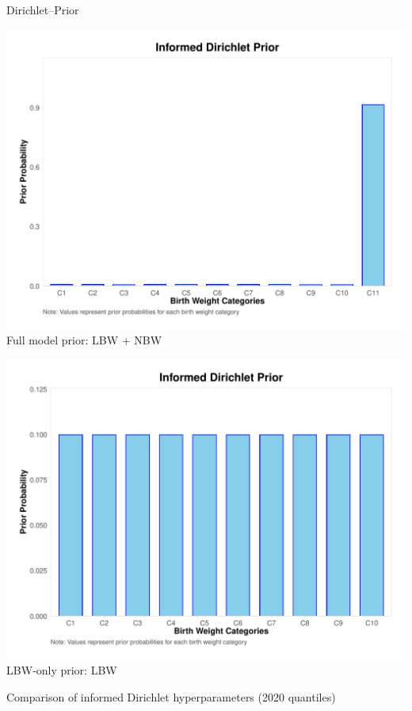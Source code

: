 \documentclass[aspectratio=169,professionalfonts]{beamer}
\begin{document}
\begin{frame}{Dirichlet–Prior}
\centering
\scriptsize
\begin{minipage}{0.46\linewidth}
  \centering
  \includegraphics[width=\linewidth]{plots/alphavec_plot_2020_full.pdf}\\[-1ex]
  {\footnotesize Full model prior: LBW + NBW}
\end{minipage}
\hfill
\begin{minipage}{0.46\linewidth}
  \centering
  \includegraphics[width=\linewidth]{plots/alphavec_plot_2020_small.pdf}\\[-1ex]
  {\footnotesize LBW‑only prior: LBW}
\end{minipage}

\vspace{4pt}
\small Comparison of informed Dirichlet hyperparameters (2020 quantiles)
\end{frame}
\end{document}
